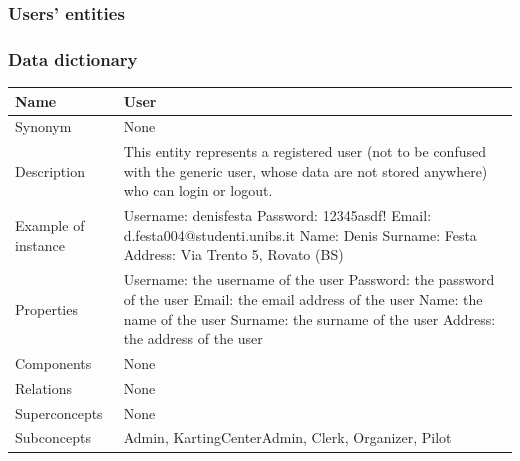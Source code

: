 \documentclass{beamer}
\begin{document}
\subsubsection{Users' entities}

\begin{frame}
    \frametitle{Data dictionary}
    \begin{table}
    \tiny
    \begin{tabular}{|p{2cm}|p{6cm}|}
    \hline
    Name & \textbf{User} \\
    \hline
    Synonym & None \\
    \hline
    Description & This entity represents a registered user
    (not to be confused with the generic user, whose data
    are not stored anywhere) who can login or logout. \\
    \hline
    Example of instance &
    Username: denisfesta \newline
    Password: 12345asdf!  \newline
    Email: d.festa004@studenti.unibs.it \newline
    Name: Denis \newline
    Surname: Festa \newline
    Address: Via Trento 5, Rovato (BS) \\
    \hline
    Properties &
    Username: the username of the user \newline
    Password: the password of the user \newline
    Email: the email address of the user \newline
    Name: the name of the user \newline
    Surname: the surname of the user \newline
    Address: the address of the user \\
    \hline
    Components & None \\
    \hline
    Relations & None \\
    \hline
    Superconcepts & None \\
    \hline
    Subconcepts & Admin, KartingCenterAdmin, Clerk, Organizer, Pilot \\
    \hline
    \end{tabular}
    \end{table}
\end{frame}
\end{document}
